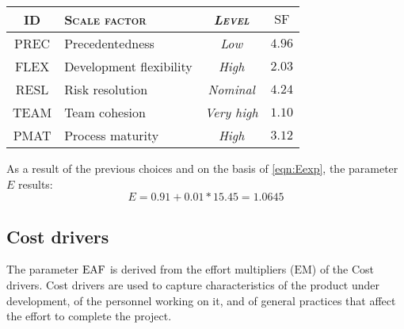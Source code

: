 \begin{table}\begin{tabularx}{\textwidth}{ >{\ttfamily}c X >{\itshape}c c }

\toprule
\normalfont\textsc{ID} & \normalfont\textsc{Scale factor} & \normalfont\textsc{Level} & $ \text{SF} $ \\
\toprule
PREC	& Precedentedness			& Low		& $ 4.96 $ \\ \midrule
FLEX	& Development flexibility	& High		& $ 2.03 $ \\ \midrule
RESL	& Risk resolution			& Nominal	& $ 4.24 $\\ \midrule
TEAM	& Team cohesion				& Very high	& $ 1.10 $\\ \midrule
PMAT	& Process maturity			& High		& $ 3.12 $\\ 

\bottomrule
	
\end{tabularx}
\end{table}



As a result of the previous choices and on the basis of \cref{eqn:Eexp}, the parameter $ E $ results:
\begin{equation}
	E = 0.91 + 0.01 * 15.45 = 1.0645
\end{equation}

















\subsection*{Cost drivers} The parameter $ \text{EAF} $ is derived from the effort multipliers ($ \text{EM} $) of the Cost drivers. Cost drivers are used to capture characteristics of the product under development, of the personnel working on it, and of general practices that affect the effort to complete the project.



